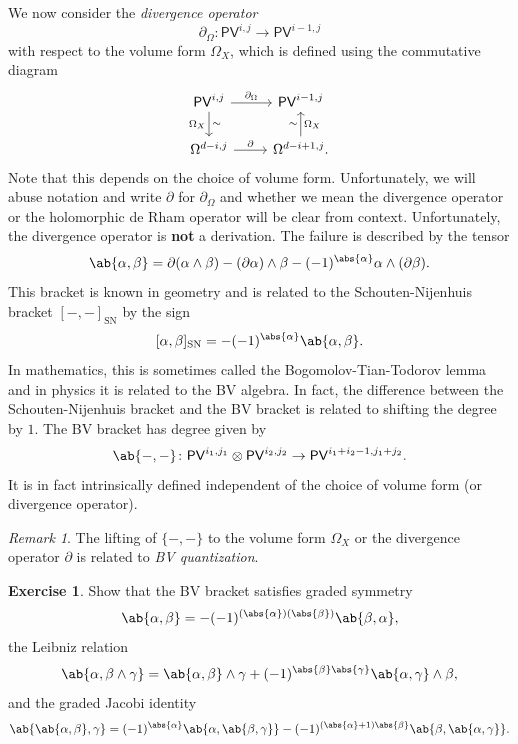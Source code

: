 \documentclass[article,10pt,oneside,oldfontcommands]{memoir}
\theoremstyle{definition}
\newtheorem{exer}[thm]{Exercise}
\theoremstyle{remark}
\newtheorem{rmk}[thm]{Remark}
\theoremstyle{plain}
\theoremstyle{definition}
\theoremstyle{remark}
\newcommand{\mr}[1]{\mathrm{#1}}
\newcommand{\ms}[1]{\mathsf{#1}}
\newcommand{\1}{\mathbf{1}}
\newcommand{\2}{\mathbf{2}}
\newcommand{\3}{\mathbf{3}}
\begin{document}
We now consider the \textit{divergence operator}
\[ \partial_{\Omega} \colon \ms{PV}^{i,j} \to \ms{PV}^{i-1, j} \]
with respect to the volume form \(\Omega_X\), which is defined using the commutative diagram
\begin{equation*}
\begin{tikzcd}
    \ms{PV}^{i,j} \ar{d}{\sim}[swap]{\Omega_X} \ar{r}{\partial_{\Omega}} & \ms{PV}^{i-1, j} \\
    \Omega^{d-i,j} \ar{r}{\partial} & \Omega^{d-i+1, j} \ar{u}{\sim}[swap]{\Omega_X}.
\end{tikzcd}
\end{equation*}
Note that this depends on the choice of volume form. Unfortunately, we will abuse notation and write \(\partial\) for \(\partial_{\Omega}\) and whether we mean the divergence operator or the holomorphic de Rham operator will be clear from context. Unfortunately, the divergence operator is \textbf{not} a derivation. The failure is described by the tensor
\[ \ab\{\alpha, \beta \} = \partial(\alpha \wedge \beta) - (\partial \alpha) \wedge \beta - (-1)^{\abs{\alpha}} \alpha \wedge (\partial \beta). \]
This bracket is known in geometry and is related to the Schouten-Nijenhuis bracket \([-,-]_{\mr{SN}}\) by the sign
\[ [\alpha, \beta]_{\mr{SN}} = -(-1)^{\abs{\alpha}} \ab\{\alpha, \beta \}. \]
In mathematics, this is sometimes called the Bogomolov-Tian-Todorov lemma and in physics it is related to the BV algebra. In fact, the difference between the Schouten-Nijenhuis bracket and the BV bracket is related to shifting the degree by \(1\). The BV bracket has degree given by
\[ \ab\{-,-\} \colon \ms{PV}^{i_1, j_1} \otimes \ms{PV}^{i_2, j_2} \to \ms{PV}^{i_1 + i_2 - 1, j_1 + j_2}. \]
It is in fact intrinsically defined independent of the choice of volume form (or divergence operator). 

\begin{rmk}
    The lifting of \(\{-,-\}\) to the volume form \(\Omega_X\) or the divergence operator \(\partial\) is related to \textit{BV quantization}.
\end{rmk}

\begin{exer}
    Show that the BV bracket satisfies
    graded symmetry 
    \[\ab\{\alpha, \beta\} = -(-1)^{(\abs{\alpha})(\abs{\beta})} \ab\{\beta, \alpha\}, \]
    the Leibniz relation
    \[  \ab\{\alpha, \beta \wedge \gamma\} = \ab\{\alpha, \beta\} \wedge \gamma + (-1)^{\abs{\beta} \abs{\gamma}} \ab\{\alpha, \gamma\} \wedge \beta, \]
    and the graded Jacobi identity 
    \[ \ab\{ \ab\{ \alpha, \beta \}, \gamma\} = (-1)^{\abs{\alpha}} \ab\{\alpha, \ab\{\beta, \gamma\}\} - (-1)^{(\abs{\alpha}+1)\abs{\beta}} \ab\{\beta, \ab\{\alpha, \gamma\}\}. \]
\end{exer}
\end{document}
